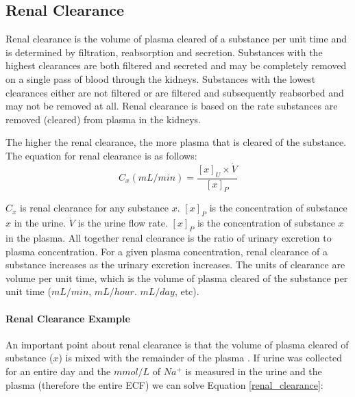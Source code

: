 \subsection{Renal Clearance}

Renal clearance is the volume of plasma cleared of a substance per unit time and is determined by filtration, reabsorption and secretion. Substances with the highest clearances are both filtered and secreted and may be completely removed on a single pass of blood through the kidneys. Substances with the lowest clearances either are not filtered or are filtered and subsequently reabsorbed and may not be removed at all.  Renal clearance is based on the rate substances are removed (cleared) from plasma in the kidneys.

The higher the renal clearance, the more plasma that is cleared of the substance. The equation for renal clearance is as follows:
\vspace{4mm}
\begin{equation}
    C_x (mL/min) = \frac{[x]_U \times \dot{V}}{[x]_P}
    \label{renal_clearance}
\end{equation}

\vspace{4mm}

$C_x$ is renal clearance for any substance $x$. $[x]_P$ is the concentration of substance $x$ in the urine. $\dot{V}$ is the urine flow rate. $[x]_P$ is the concentration of substance $x$ in the plasma. All together renal clearance is the ratio of urinary excretion to plasma concentration. For a given plasma concentration, renal clearance of a substance increases as the urinary excretion increases. The units of clearance are volume per unit time, which is the volume of plasma cleared of the substance per unit time ($mL/min$, $mL/hour$. $mL/day$, etc).

\paragraph{Renal Clearance Example}

An important point about renal clearance is that the volume of plasma cleared of substance ($x$) is mixed with the remainder of the plasma \cite{richardson_addressing_2004}. If urine was collected for an entire day and the $mmol/L$ of $Na^+$ is measured in the urine and the plasma (therefore the entire ECF) we can solve Equation \ref{renal_clearance}:

\vspace{4mm}

